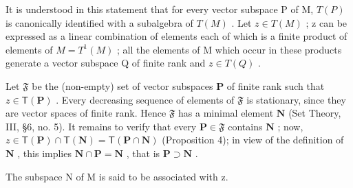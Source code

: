 It is understood in this statement that for every vector subspace P of M, \(T(P)\) is canonically identified with a subalgebra of \(T(M)\) . Let \(z \in T(M)\) ; z can be expressed as a linear combination of elements each of which is a finite product of elements of \(M = T^{1}(M)\) ; all the elements of M which occur in these products generate a vector subspace Q of finite rank and \(z \in T(Q)\) .

Let \(\mathfrak{F}\) be the (non-empty) set of vector subspaces \(\mathbf{P}\) of finite rank such that \(z\in \mathsf{T}(\mathbf{P})\) . Every decreasing sequence of elements of \(\mathfrak{F}\) is stationary, since they are vector spaces of finite rank. Hence \(\mathfrak{F}\) has a minimal element \(\mathbf{N}\) (Set Theory, III, §6, no. 5). It remains to verify that every \(\mathbf{P}\in \mathfrak{F}\) contains \(\mathbf{N}\) ; now, \(z\in \mathsf{T}(\mathbf{P})\cap \mathsf{T}(\mathbf{N}) = \mathsf{T}(\mathbf{P}\cap \mathbf{N})\) (Proposition 4); in view of the definition of \(\mathbf{N}\) , this implies \(\mathbf{N}\cap \mathbf{P} = \mathbf{N}\) , that is \(\mathbf{P}\supset \mathbf{N}\) .

The subspace N of M is said to be associated with z.

